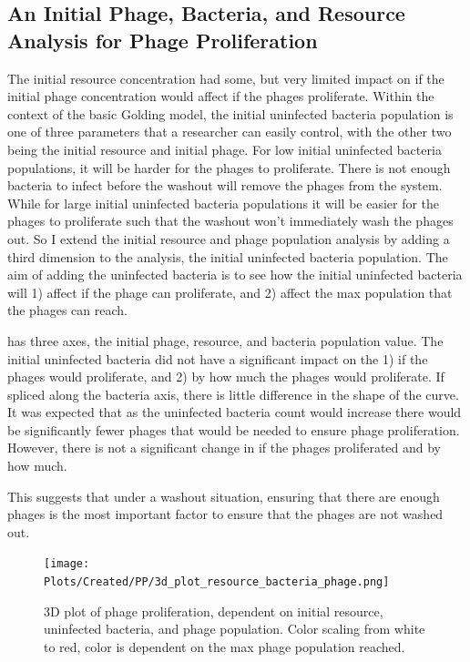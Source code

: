 \subsection{An Initial Phage, Bacteria, and Resource Analysis for Phage Proliferation}
The initial resource concentration had some, but very limited impact on if the initial phage concentration would affect if the phages proliferate. 
Within the context of the basic Golding model, the initial uninfected bacteria population is one of three parameters that a researcher can easily control, with the other two being the initial resource and initial phage. 
For low initial uninfected bacteria populations, it will be harder for the phages to proliferate. 
There is not enough bacteria to infect before the washout will remove the phages from the system. 
While for large initial uninfected bacteria populations it will be easier for the phages to proliferate such that the washout won't immediately wash the phages out. 
So I extend the initial resource and phage population analysis by adding a third dimension to the analysis, the initial uninfected bacteria population. 
The aim of adding the uninfected bacteria is to see how the initial uninfected bacteria will 1) affect if the phage can proliferate, and 2) affect the max population that the phages can reach. 

 has three axes, the initial phage, resource, and bacteria population value. 
The initial uninfected bacteria did not have a significant impact on the 1) if the phages would proliferate, and 2) by how much the phages would proliferate. 
If spliced along the bacteria axis, there is little difference in the shape of the curve. 
It was expected that as the uninfected bacteria count would increase there would be significantly fewer phages that would be needed to ensure phage proliferation. 
However, there is not a significant change in if the phages proliferated and by how much. 

This suggests that under a washout situation, ensuring that there are enough phages is the most important factor to ensure that the phages are not washed out. 

\begin{figure}[ht!]
    \texttt{[image: Plots/Created/PP/3d\_plot\_resource\_bacteria\_phage.png]}
    \centering
    \caption{
        3D plot of phage proliferation, dependent on initial resource, uninfected bacteria, and phage population. 
        Color scaling from white to red, color is dependent on the max phage population reached. 
    \label{fig:created:3D_phase_portrait}
    }
\end{figure}

